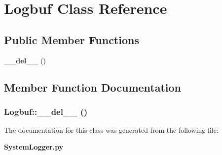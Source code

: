 \section{Logbuf Class Reference}
\label{classLogbuf}
\subsection*{Public Member Functions}
\begin{CompactItemize}
\item 
{\bf \_\-\_\-del\_\-\_\-} ()
\end{CompactItemize}


\subsection{Member Function Documentation}
\subsubsection{\setlength{\rightskip}{0pt plus 5cm}Logbuf::\_\-\_\-del\_\-\_\- ()}\label{classLogbuf_Logbufa0}




The documentation for this class was generated from the following file:\begin{CompactItemize}
\item 
{\bf System\-Logger.py}\end{CompactItemize}
